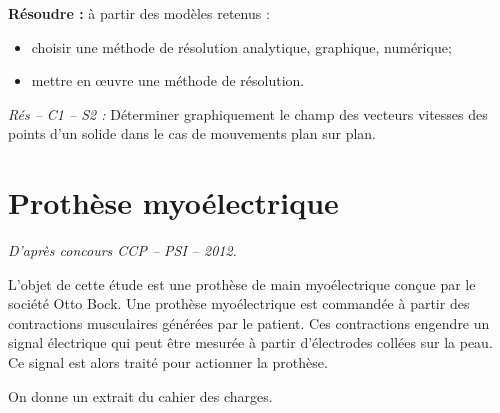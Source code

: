 \documentclass[10pt]{article}
\newif\ifprof
\begin{document}






\begin{comp}
\noindent \textbf{Résoudre :} à partir des modèles retenus :
\begin{itemize}
\item choisir une méthode de résolution analytique, graphique, numérique;
\item mettre en \oe{}uvre une méthode de résolution.
\end{itemize}

\noindent \textit{Rés -- C1 -- S2 :} Déterminer graphiquement le champ des vecteurs vitesses des points d’un solide dans le cas de mouvements plan sur plan.

\end{comp}

\section*{Prothèse myoélectrique}

\begin{flushright}
\textit{D'après concours CCP -- PSI -- 2012.}
\end{flushright}

\ifprof
\else

\begin{minipage}[c]{.8\linewidth}
L'objet de cette étude est une prothèse de main myoélectrique conçue par le société Otto Bock. 
Une prothèse myoélectrique est commandée à partir des contractions musculaires générées par le patient. Ces contractions engendre un signal électrique qui peut être mesurée à partir d'électrodes collées sur la peau. Ce signal est alors traité pour actionner la prothèse.
\begin{obj} 

\end{obj}

 On donne un extrait du cahier des charges.
 
\end{minipage} \hfill
\begin{minipage}[c]{.15\linewidth}
\begin{center}
\end{center}
\end{minipage}
\end{document}
